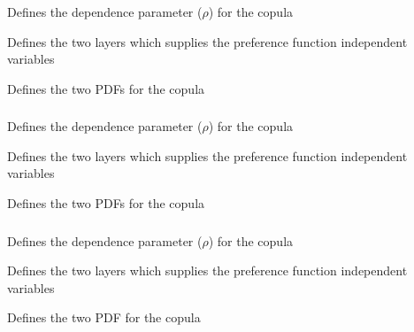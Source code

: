 \subsubsection[Gaussian copula]{}

 {Defines the dependence parameter ($\rho$) for the copula}

 {Defines the two layers which supplies the preference function independent variables}

 {Defines the two PDFs for the copula}

\subsubsection[Gumbel copula]{}

 {Defines the dependence parameter ($\rho$) for the copula}

 {Defines the two layers which supplies the preference function independent variables}

 {Defines the two PDFs for the copula}

\subsubsection[Frank copula]{}

 {Defines the dependence parameter ($\rho$) for the copula}

 {Defines the two layers which supplies the preference function independent variables}

 {Defines the two PDF for the copula}

